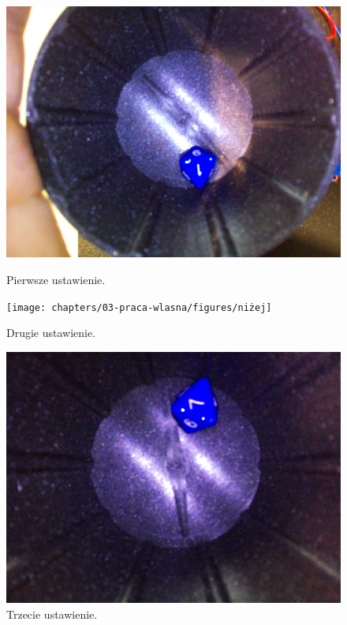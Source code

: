 \begin{figure}[h]
    \centering
    \begin{minipage}{0.32\textwidth}
        \centering
        \includegraphics[width=\linewidth]{chapters/03-praca-wlasna/figures/wysoko}
        \caption{\label{fig:wysoko}Pierwsze ustawienie.}
    \end{minipage}
    \hfill
    \begin{minipage}{0.32\textwidth}
        \centering
        \texttt{[image: chapters/03-praca-wlasna/figures/niżej]}
        \caption{\label{fig:nizej}Drugie ustawienie.}
    \end{minipage}
    \hfill
    \begin{minipage}{0.32\textwidth}
        \centering
        \includegraphics[width=\linewidth]{chapters/03-praca-wlasna/figures/ideolo}
        \caption{\label{fig:ideolo}Trzecie ustawienie.}
    \end{minipage}
\end{figure}

